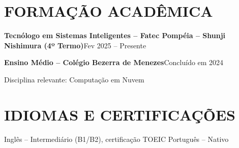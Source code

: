 \documentclass[9pt,a4paper]{extarticle}
\newcommand{\entry}[2]{\vspace{2pt}\noindent\textbf{#1}\hfill{\color{gray}#2}\par}
\begin{document}
\section*{FORMAÇÃO ACADÊMICA}
\entry{Tecnólogo em Sistemas Inteligentes – Fatec Pompéia – Shunji Nishimura (4º Termo)}{Fev 2025 – Presente}
\entry{Ensino Médio – Colégio Bezerra de Menezes}{Concluído em 2024}
{\color{gray}Disciplina relevante: Computação em Nuvem}

\section*{IDIOMAS E CERTIFICAÇÕES}
Inglês – Intermediário (B1/B2), certificação TOEIC \textperiodcentered{} Português – Nativo
\end{document}
